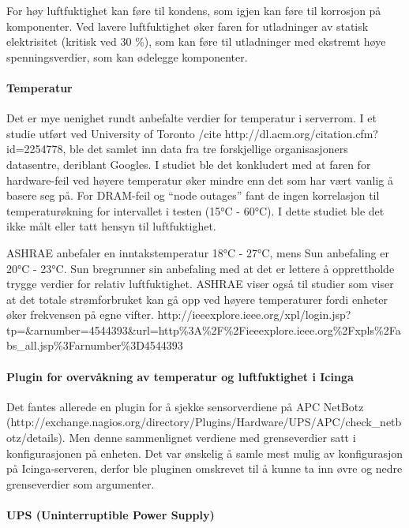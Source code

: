 For høy luftfuktighet kan føre til kondens, som igjen kan føre til korrosjon på komponenter. Ved lavere luftfuktighet øker faren for utladninger av statisk elektrisitet (kritisk ved 30 \%), som kan føre til utladninger med ekstremt høye spenningsverdier, som kan ødelegge komponenter.

\paragraph{Temperatur}

Det er mye uenighet rundt anbefalte verdier for temperatur i serverrom. I et studie utført ved University of Toronto /cite http://dl.acm.org/citation.cfm?id=2254778, ble det samlet inn data fra tre forskjellige organisasjoners datasentre, deriblant Googles. I studiet ble det konkludert med at faren for hardware-feil ved høyere temperatur øker mindre enn det som har vært vanlig å basere seg på. For DRAM-feil og “node outages” fant de ingen korrelasjon til temperaturøkning for intervallet i testen (15°C - 60°C). I dette studiet ble det ikke målt eller tatt hensyn til luftfuktighet. 

ASHRAE anbefaler en inntakstemperatur 18°C - 27°C, mens Sun anbefaling er 20°C - 23°C. Sun bregrunner sin anbefaling med at det er lettere å opprettholde trygge verdier for relativ luftfuktighet. ASHRAE viser også til studier som viser at det totale strømforbruket kan gå opp ved høyere temperaturer fordi enheter øker frekvensen på egne vifter. http://ieeexplore.ieee.org/xpl/login.jsp?tp=&arnumber=4544393&url=http\%3A\%2F\%2Fieeexplore.ieee.org\%2Fxpls\%2Fabs\_all.jsp\%3Farnumber\%3D4544393

\paragraph{Plugin for overvåkning av temperatur og luftfuktighet i Icinga}

Det fantes allerede en plugin for å sjekke sensorverdiene på APC NetBotz (http://exchange.nagios.org/directory/Plugins/Hardware/UPS/APC/check\_netbotz/details). Men denne sammenlignet verdiene med grenseverdier satt i konfigurasjonen på enheten. Det var ønskelig å samle mest mulig av konfigurasjon på Icinga-serveren, derfor ble pluginen omskrevet til å kunne ta inn øvre og nedre grenseverdier som argumenter.

\paragraph{UPS (Uninterruptible Power Supply)}

